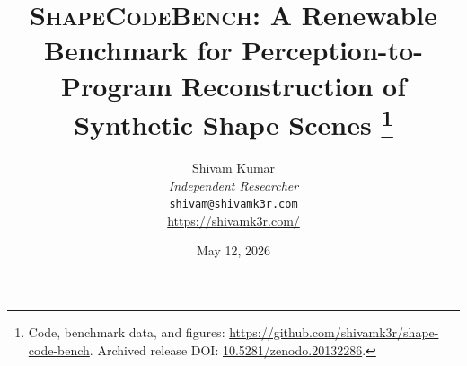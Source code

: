 \documentclass[11pt]{article}
\title{\textsc{ShapeCodeBench}: A Renewable Benchmark for Perception-to-Program Reconstruction of Synthetic Shape Scenes%
  \thanks{Code, benchmark data, and figures: \url{https://github.com/shivamk3r/shape-code-bench}. Archived release DOI: \href{https://doi.org/10.5281/zenodo.20132286}{10.5281/zenodo.20132286}.}}
\author{%
  Shivam Kumar \\
  \textit{Independent Researcher} \\
  \texttt{shivam@shivamk3r.com} \\
  \url{https://shivamk3r.com/}
}
\date{May 12, 2026}
\begin{document}
\maketitle

\begin{abstract}

\end{abstract}











\appendix

\end{document}
